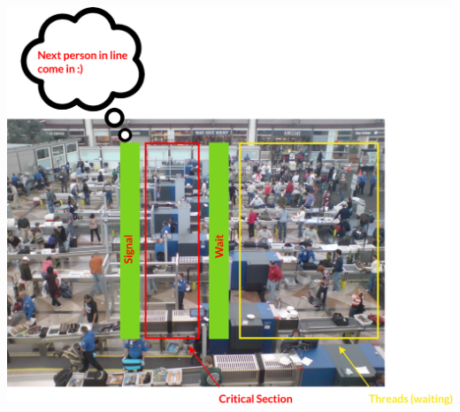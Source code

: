 \documentclass[12pt]{article}
\begin{document}
\begin{itemize}
\begin{enumerate}[1.]
\begin{itemize}
            \begin{center}
            \includegraphics[width=0.8\linewidth]{images/week_3_notes_1_5.png}
            \end{center}
        \end{itemize}
    \end{enumerate}
\end{itemize}

\bigskip
\end{document}
